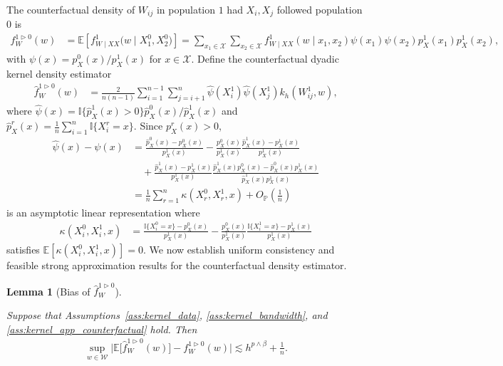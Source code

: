 \documentclass[11pt,lof]{puthesis}
\renewcommand{\P}{\ensuremath{\mathbb{P}}}
\newcommand{\E}{\ensuremath{\mathbb{E}}}
\newcommand{\I}{\ensuremath{\mathbb{I}}}
\newcommand{\cX}{\ensuremath{\mathcal{X}}}
\newcommand{\cW}{\ensuremath{\mathcal{W}}}
\theoremstyle{break}
\newtheorem{lemma}{Lemma}[section]
\theoremstyle{proof}
\begin{document}
The counterfactual density of $W_{i j}$ in population $1$ had $X_i, X_j$
followed population $0$ is
%
\begin{align*}
  f_W^{1 \triangleright 0}(w)
  &=
  \E\left[
    f_{W \mid XX}^1\big(w \mid X_1^0, X_2^0\big)
  \right]
  = \sum_{x_1 \in \cX}
  \sum_{x_2 \in \cX}
  f_{W \mid XX}^{1}(w \mid x_1, x_2)
  \psi(x_1)
  \psi(x_2)
  p_X^{1}(x_1)
  p_X^{1}(x_2),
\end{align*}
%
with $\psi(x) = p_X^0(x)/p_X^1(x)$ for $x \in \cX$.
Define the counterfactual dyadic kernel density estimator
%
\begin{align*}
  \hat f_W^{1 \triangleright 0}(w)
  &=
  \frac{2}{n(n-1)}
  \sum_{i=1}^{n-1}
  \sum_{j=i+1}^n
  \hat \psi(X_i^1)
  \hat \psi(X_j^1)
  k_h(W_{i j}^1, w),
\end{align*}
%
where $\hat\psi(x) = \I\{\hat p_X^{1}(x) > 0\}\hat p_X^{0}(x) / \hat p_X^{1}(x)$
and $\hat p_X^{r}(x) = \frac{1}{n}\sum_{i = 1}^n \I\{X_i^r = x\}$.
Since $p_X^r(x) > 0$,
%
\begin{align*}
  \hat\psi(x) - \psi(x)
  &=
  \frac{\hat p_X^{0}(x) - p_X^0(x)}{p_X^1(x)}
  - \frac{p_X^0(x)}{p_X^1(x)}
  \frac{\hat p_X^{1}(x) - p_X^1(x)}{p_X^1(x)} \\
  &\quad+
  \frac{\hat p_X^{1}(x) - p_X^1(x)}{p_X^1(x)}
  \frac{\hat p_X^{1}(x) p_X^0(x) - \hat p_X^{0}(x)p_X^1(x)}
  {\hat p_X^{1}(x) p_X^1(x)} \\
  &=
  \frac{1}{n}
  \sum_{r=1}^n \kappa(X_r^0, X_r^1, x)
  + O_\P\left(\frac{1}{n}\right)
\end{align*}
%
is an asymptotic linear representation where
%
\begin{align*}
  \kappa(X_i^0, X_i^1, x)
  &=
  \frac{\I\{X_i^0 = x\} - p_X^0(x)}{p_X^1(x)}
  - \frac{p_X^0(x)}{p_X^1(x)}
  \frac{\I\{X_i^1 = x\} - p_X^1(x)}{p_X^1(x)}
\end{align*}
%
satisfies $\E[\kappa(X_i^0, X_i^1, x)] = 0$.
We now establish uniform consistency and feasible strong
approximation results for the counterfactual density estimator.

\begin{lemma}[Bias of $\hat f_W^{1 \triangleright 0}$]
  \label{lem:kernel_app_counterfactual_bias}

  Suppose that Assumptions~\ref{ass:kernel_data},
  \ref{ass:kernel_bandwidth}, and \ref{ass:kernel_app_counterfactual} hold.
  Then
  \begin{align*}
    \sup_{w \in \cW}
    \big|
    \E\big[\hat f_W^{1 \triangleright 0}(w)\big]
    - f_W^{1 \triangleright 0}(w)
    \big|
    \lesssim
    h^{p \wedge \beta} + \frac{1}{n}.
  \end{align*}

\end{lemma}
\end{document}
